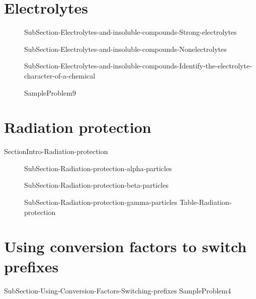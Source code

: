 \documentclass[main.tex]{subfiles}
\begin{document}
\section{ \faTint Electrolytes }
\sloppy \begin{description}
\item[]{SubSection-Electrolytes-and-insoluble-compounds-Strong-electrolytes}
\item[]{SubSection-Electrolytes-and-insoluble-compounds-Nonelectrolytes}

\item[]{SubSection-Electrolytes-and-insoluble-compounds-Identify-the-electrolyte-character-of-a-chemical}
 \vspace{1cm}{Table-Electrolytes	}	

{SampleProblem9}
\end{description}

 
%
% 
%
%







\section{\faFlash Radiation protection}
{SectionIntro-Radiation-protection}
\sloppy \begin{description}
\item[] 
{SubSection-Radiation-protection-alpha-particles}
\item[] 
{SubSection-Radiation-protection-beta-particles}
\item[] 
{SubSection-Radiation-protection-gamma-particles}
{Table-Radiation-protection}
\end{description}
 
 
 
 

\section{\faGears Using conversion factors to switch prefixes} 
{SubSection-Using-Conversion-Factors-Switching-prefixes}
{SampleProblem4}
 
 


\end{document}
